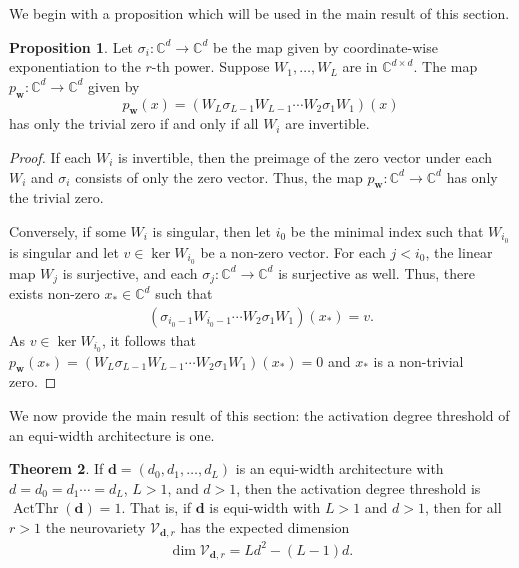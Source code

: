 \documentclass[12pt]{article}
\theoremstyle{definition}
\newtheorem{theorem}{Theorem}
\newtheorem{proposition}[theorem]{Proposition}
\DeclareMathOperator{\ActThr}{ActThr}
\newcommand{\sigmaCC}[1]{{\sigma_{#1}}}
\renewcommand{\dim}[1]{\operatorname{dim}{#1}}
\begin{document}
We begin with a proposition which will be used in the main result of this section.


\begin{proposition}\label{prop:zeros-V2}
Let 
{$\sigmaCC{i}:\mathbb{C}^{d}\to\mathbb{C}^{d}$} 
be the map given by coordinate-wise exponentiation to the $r$-th power. 
{Suppose $W_1,\dots,W_L$ are  in $\mathbb{C}^{d\times d}$. }
The map 
$p_{\mathbf{w}}:\mathbb{C}^d\to \mathbb{C}^d$ given by
\[p_{\mathbf{w}}(x) = (W_L\sigmaCC{L-1} W_{L-1}\dotsb W_2\sigmaCC{1} W_1)(x)\] 
has only the trivial zero if and only if all $W_i$ are invertible. 
\end{proposition}



\begin{proof}
If each $W_i$ is invertible, then the preimage of the zero vector under each $W_i$ and $\sigmaCC{i}$ consists of only the zero vector. 
Thus, the map 
$p_{\mathbf{w}}:\mathbb{C}^d\to \mathbb{C}^d$  
has only the trivial zero. 

Conversely, if some $W_i$ is singular, then let $i_0$ be the minimal index such that $W_{i_0}$ 
is singular and let $v\in\ker W_{i_0}$ be a non-zero vector. 
For each $j<i_0$, the linear map $W_j$ is surjective, and each 
$\sigmaCC{j}:\mathbb{C}^d\to\mathbb{C}^d$
is surjective as well.
Thus, there exists non-zero 
$x_\ast\in\mathbb{C}^d$ such that 
\begin{align*}
(\sigmaCC{i_0-1} W_{i_0-1}\dotsb W_2\sigmaCC{1} W_1)(x_\ast) = v. 
\end{align*}
As $v\in\ker W_{i_0}$, it follows that $p_{\mathbf{w}}(x_\ast) = (W_L\sigmaCC{L-1} W_{L-1}\dotsb W_2\sigmaCC{1} W_1)(x_\ast) = 0$ and $x_\ast$ is a non-trivial zero.
\end{proof}

We now provide the main result of this section: the activation degree threshold of an equi-width architecture is one. 


\begin{theorem}\label{thm:equi-width-expected-v2}
If $\mathbf{d} = (d_0,d_1,\dotsc,d_L)$ is an equi-width architecture with $d = d_0 =d_1 \dotsb = d_L$, $L>1$, and $d>1$, then the activation degree threshold is $\ActThr(\mathbf{d}) = 1$. That is, if $\mathbf{d}$ is equi-width with $L>1$ and $d>1$, then for all $r>1$ the neurovariety $\mathcal{V}_{\mathbf{d},r}$ has the expected dimension 
\begin{align*}
\dim{\mathcal{V}_{\mathbf{d},r}} = Ld^2 - (L-1)d.
\end{align*}
\end{theorem}
\end{document}
